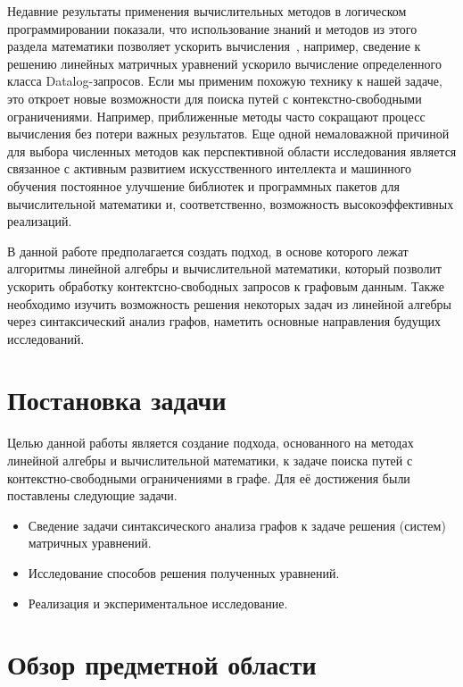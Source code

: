 \documentclass[12pt]{matmex-diploma-custom}
\begin{document}
Недавние результаты применения вычислительных методов в логическом программировании показали, что использование знаний и методов из этого раздела математики позволяет ускорить вычисления~\cite{aspis2018linear, sato2017linear}, например, сведение к решению линейных матричных уравнений ускорило вычисление определенного класса Datalog-запросов. 
Если мы применим похожую технику к нашей задаче, это откроет новые возможности для поиска путей с контекстно-свободными ограничениями. 
Например, приближенные методы часто сокращают процесс вычисления без потери важных результатов. 
Еще одной немаловажной причиной для выбора численных методов как перспективной области исследования является связанное с активным развитием искусственного интеллекта и машинного обучения постоянное улучшение библиотек и программных пакетов для вычислительной математики и, соответственно, возможность высокоэффективных реализаций.

В данной работе предполагается создать подход, в основе которого лежат алгоритмы линейной алгебры и вычислительной математики, который позволит ускорить обработку контектсно-свободных запросов к графовым данным. Также необходимо изучить возможность решения некоторых задач из линейной алгебры через синтаксический анализ графов, наметить основные направления будущих исследований.



\section{Постановка задачи}

Целью данной работы является создание подхода, основанного на методах линейной алгебры и вычислительной математики, к задаче поиска путей с контекстно-свободными ограничениями в графе.
Для её достижения были поставлены следующие задачи.

\begin{itemize}
	\item Сведение задачи синтаксического анализа графов к задаче решения (систем) матричных уравнений.
    \item Исследование способов решения полученных уравнений.
    \item Реализация и экспериментальное исследование.
\end{itemize}
	

\section{Обзор предметной области}
\end{document}
